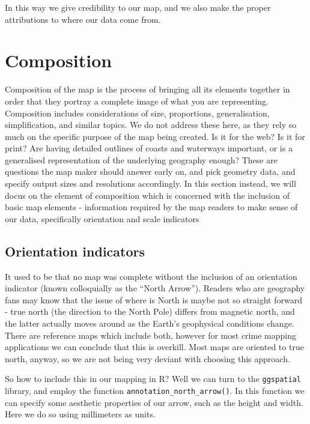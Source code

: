 \documentclass[
]{book}
\begin{document}
In this way we give credibility to our map, and we also make the proper attributions to where our data come from.

\hypertarget{composition}{%
\section{Composition}\label{composition}}

Composition of the map is the process of bringing all its elements together in order that they portray a complete image of what you are representing. Composition includes considerations of size, proportions, generalisation, simplification, and similar topics. We do not address these here, as they rely so much on the specific purpose of the map being created. Is it for the web? Is it for print? Are having detailed outlines of coasts and waterways important, or is a generalised representation of the underlying geography enough? These are questions the map maker should answer early on, and pick geometry data, and specify output sizes and resolutions accordingly. In this section instead, we will docus on the element of composition which is concerned with the inclusion of basic map elements - information required by the map readers to make sense of our data, specifically orientation and scale indicators

\hypertarget{orientation-indicators}{%
\subsection{Orientation indicators}\label{orientation-indicators}}

It used to be that no map was complete without the inclusion of an orientation indicator (known colloquially as the ``North Arrow''). Readers who are geography fans may know that the issue of where is North is maybe not so straight forward - true north (the direction to the North Pole) differs from magnetic north, and the latter actually moves around as the Earth's geophysical conditions change. There are reference maps which include both, however for most crime mapping applications we can conclude that this is overkill. Most maps are oriented to true north, anyway, so we are not being very deviant with choosing this approach.

So how to include this in our mapping in R? Well we can turn to the \texttt{ggspatial} library, and employ the function \texttt{annotation\_north\_arrow()}. In this function we can specify some aesthetic properties of our arrow, such as the height and width. Here we do so using millimeters as units.
\end{document}
